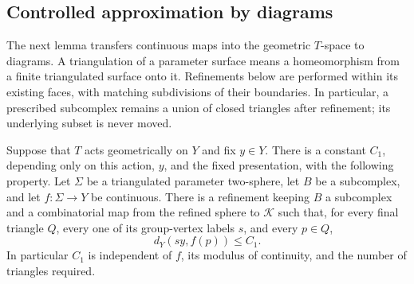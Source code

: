 \subsection{Controlled approximation by diagrams}

The next lemma transfers continuous maps into the geometric
$T$-space to diagrams.  A triangulation of a parameter surface
means a homeomorphism from a finite triangulated surface onto it.
Refinements below are performed within its existing faces, with
matching subdivisions of their boundaries.  In particular, a
prescribed subcomplex remains a union of closed triangles after
refinement; its underlying subset is never moved.

\begin{lemma}\label{lem:controlled-diagrams}
Suppose that $T$ acts geometrically on $Y$ and fix $y\in Y$.
There is a constant $C_1$, depending only on this action, $y$, and
the fixed presentation, with the following property.  Let $\Sigma$
be a triangulated parameter two-sphere, let $B$ be a subcomplex,
and let $f:\Sigma\to Y$ be continuous.  There is a refinement
keeping $B$ a subcomplex and a combinatorial map from the refined
sphere to $\mathcal K$ such that, for every final triangle $Q$,
every one of its group-vertex labels $s$, and every $p\in Q$,
\begin{equation}\label{eq:all-points-control}
  d_Y(sy,f(p))\le C_1.
\end{equation}
In particular $C_1$ is independent of $f$, its modulus of
continuity, and the number of triangles required.
\end{lemma}

